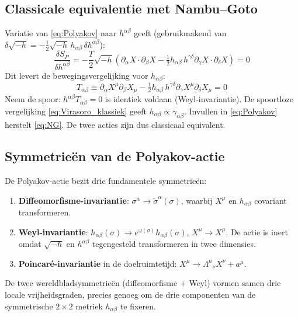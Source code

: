 \documentclass[12pt,a4paper]{article}
\begin{document}
        \subsection{Classicale equivalentie met Nambu--Goto}

            Variatie van \eqref{eq:Polyakov} naar $h^{\alpha\beta}$ geeft (gebruikmakend van $\delta\sqrt{-h} = -\tfrac{1}{2}\sqrt{-h}\,h_{\alpha\beta}\,\delta h^{\alpha\beta}$):
            \begin{equation}
                \frac{\delta S_P}{\delta h^{\alpha\beta}} = -\frac{T}{2}\sqrt{-h}\left(\partial_\alpha X\cdot\partial_\beta X - \tfrac{1}{2}h_{\alpha\beta}\,h^{\gamma\delta}\partial_\gamma X\cdot\partial_\delta X\right) = 0
            \end{equation}
            Dit levert de bewegingsvergelijking voor $h_{\alpha\beta}$:
            \begin{equation}
                T_{\alpha\beta} \equiv \partial_\alpha X^\mu\partial_\beta X_\mu - \tfrac{1}{2}h_{\alpha\beta}\,h^{\gamma\delta}\partial_\gamma X^\mu\partial_\delta X_\mu = 0
                \label{eq:Virasoro_klassiek}
            \end{equation}
            Neem de spoor: $h^{\alpha\beta}T_{\alpha\beta} = 0$ is identiek voldaan (Weyl-invariantie). De spoortloze vergelijking \eqref{eq:Virasoro_klassiek} geeft $h_{\alpha\beta} \propto \gamma_{\alpha\beta}$. Invullen in \eqref{eq:Polyakov} herstelt \eqref{eq:NG}. De twee acties zijn dus classicaal equivalent.

        \subsection{Symmetrie\"en van de Polyakov-actie}

            De Polyakov-actie bezit drie fundamentele symmetrie\"en:
            \begin{enumerate}
                \item \textbf{Diffeomorfisme-invariantie}: $\sigma^\alpha \to \tilde\sigma^\alpha(\sigma)$, waarbij $X^\mu$ en $h_{\alpha\beta}$ covariant transformeren.
                \item \textbf{Weyl-invariantie}: $h_{\alpha\beta}(\sigma) \to e^{\omega(\sigma)}h_{\alpha\beta}(\sigma)$, $X^\mu \to X^\mu$. De actie is inert omdat $\sqrt{-h}$ en $h^{\alpha\beta}$ tegengesteld transformeren in twee dimensies.
                \item \textbf{Poincar\'e-invariantie} in de doelruimtetijd: $X^\mu \to \Lambda^\mu{}_\nu X^\nu + a^\mu$.
            \end{enumerate}
            De twee wereldbladsymmetrie\"en (diffeomorfisme + Weyl) vormen samen drie locale vrijheidsgraden, precies genoeg om de drie componenten van de symmetrische $2\times2$ metriek $h_{\alpha\beta}$ te fixeren.
\end{document}
